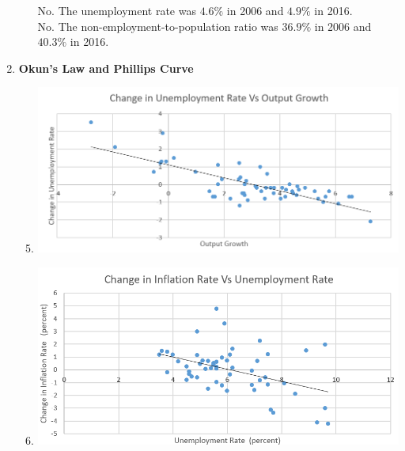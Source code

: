 \documentclass[a4paper, 11pt]{article}
\begin{document}
\begin{enumerate}[label=\textbf{(\alph*)}]
\begin{enumerate}[label=\textbf{\arabic*.}]
No. The unemployment rate was $4.6\%$ in 2006 and $4.9\%$ in 2016. \\

No. The non-employment-to-population ratio was $36.9\%$ in 2006 and $40.3\%$ in 2016. \\

\end{enumerate}
\clearpage
\item \textbf{Okun's Law and Phillips Curve}

\begin{enumerate}[label=\textbf{\arabic*.}]
\setcounter{enumi}{4}
\item \includegraphics[scale = 0.83]{okuns_law}
\item \includegraphics[scale = 0.9]{philips_curve}
\end{enumerate}
\end{enumerate}
\end{document}
